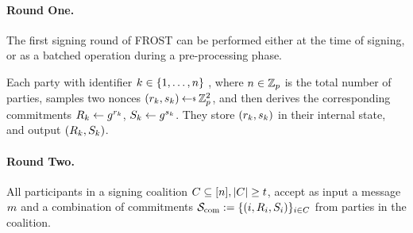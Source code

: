 \paragraph{Round One.}
The first signing round of FROST can be performed either at the time of signing,
or as a batched operation during a pre-processing phase. 

Each party with identifier $k \in \{ 1, \ldots, n\} $ , where $n \in \mathbb{Z}_p$ is the total number of parties,
samples two nonces $(r_{\partyid},  s_{\partyid}) \randpick \Zp^2$,
and then derives the corresponding commitments $R_{k} \gets g^{r_{k}}$, $ S_{k} \gets  g^{s_{k}}$.
They store $(r_{k}, s_{k})$ in their internal state,
and output $(R_{k}, S_{k})$. 

\paragraph{Round Two.}
All participants in a signing coalition $C \subseteq [n], \lvert C \rvert \geq t$,
accept as input a message $m$  and a combination  of commitments $\mathcal{S}_{\rm com} := \{ (i, R_{i}, S_{i})\}_{i \in C}$ from parties in the coalition. 

